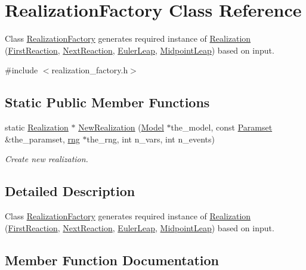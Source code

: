 \hypertarget{class_realization_factory}{}\section{Realization\+Factory Class Reference}
\label{class_realization_factory}


Class \hyperlink{class_realization_factory}{Realization\+Factory} generates required instance of \hyperlink{class_realization}{Realization} (\hyperlink{class_first_reaction}{First\+Reaction}, \hyperlink{class_next_reaction}{Next\+Reaction}, \hyperlink{class_euler_leap}{Euler\+Leap}, \hyperlink{class_midpoint_leap}{Midpoint\+Leap}) based on input.  




{\ttfamily \#include $<$realization\+\_\+factory.\+h$>$}

\subsection*{Static Public Member Functions}
\begin{DoxyCompactItemize}
\item 
static \hyperlink{class_realization}{Realization} $\ast$ \hyperlink{class_realization_factory_a4881816e453d1107de053ea3c0b8d8ba}{New\+Realization} (\hyperlink{class_model}{Model} $\ast$the\+\_\+model, const \hyperlink{class_paramset}{Paramset} \&the\+\_\+paramset, \hyperlink{classrng}{rng} $\ast$the\+\_\+rng, int n\+\_\+vars, int n\+\_\+events)
\begin{DoxyCompactList}\small\item\em Create new realization. \end{DoxyCompactList}\end{DoxyCompactItemize}


\subsection{Detailed Description}
Class \hyperlink{class_realization_factory}{Realization\+Factory} generates required instance of \hyperlink{class_realization}{Realization} (\hyperlink{class_first_reaction}{First\+Reaction}, \hyperlink{class_next_reaction}{Next\+Reaction}, \hyperlink{class_euler_leap}{Euler\+Leap}, \hyperlink{class_midpoint_leap}{Midpoint\+Leap}) based on input. 

\subsection{Member Function Documentation}
\mbox{\label{class_realization_factory_a4881816e453d1107de053ea3c0b8d8ba}} 
